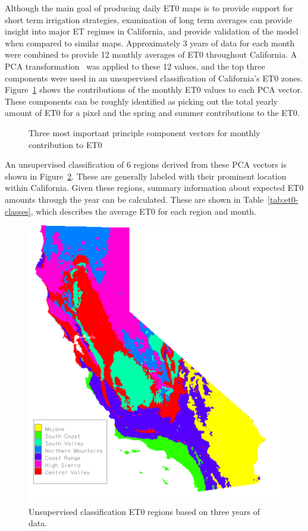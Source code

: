 \documentclass{elsart}
\begin{document}
Although the main goal of producing daily \ac{ET0} maps is to provide
support for short term irrigation strategies, examination of long term
averages can provide insight into major \ac{ET} regimes in California,
and provide validation of the model when compared to similar maps.
Approximately 3 years of data for each month were combined to provide
12 monthly averages of \ac{ET0} throughout California.  A \ac{PCA}
transformation~\citep{richards86remot-sensin} was applied to these 12
values, and the top three components were used in an unsupervised
classification of California's \ac{ET0} zones.
Figure~\ref{fig:pca_graph} shows the contributions of the monthly
\ac{ET0} values to each \ac{PCA} vector.  These components can be
roughly identified as picking out the total yearly amount of \ac{ET0}
for a pixel and the spring and summer contributions to the \ac{ET0}.

\begin{figure}
  \centering
  
  \caption{Three most important principle
    component vectors for monthly contribution to \ac{ET0}}
\label{fig:pca_graph}
\end{figure}

An unsupervised classification of 6 regions derived from these
\ac{PCA} vectors is shown in Figure~\ref{fig:et0-classes}.  These are
generally labeled with their prominent location within California.
Given these regions, summary information about expected \ac{ET0}
amounts through the year can be calculated.  These are shown in
Table~\ref{tab:et0-classes}, which describes the average \ac{ET0} for
each region and month.

\begin{figure}
  \centering
  \includegraphics[width=1\textwidth]{monthly/classes.png}  
  \caption{Unsupervised classification \ac{ET0} regions based on three
    years of data.}
  \label{fig:et0-classes}
\end{figure}
\end{document}
